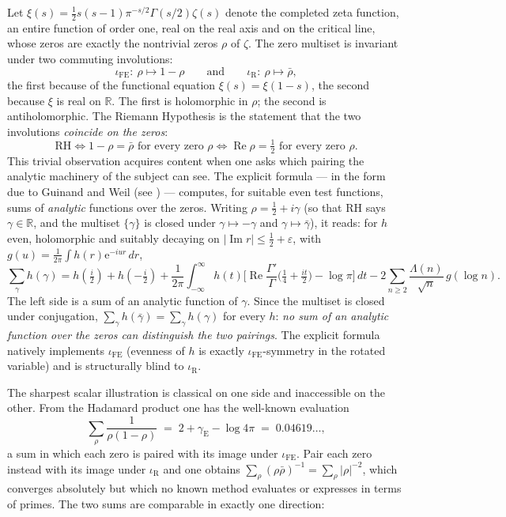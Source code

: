 \documentclass[11pt]{amsart}
\theoremstyle{definition}
\theoremstyle{remark}
\newcommand{\RR}{\mathbb{R}}
\newcommand{\eE}{\mathrm{e}}
\DeclareMathOperator{\Rre}{Re}
\DeclareMathOperator{\Iim}{Im}
\begin{document}
Let $\xi(s)=\tfrac12 s(s-1)\pi^{-s/2}\Gamma(s/2)\zeta(s)$ denote the completed zeta function, an entire function of order one, real on the real axis and on the critical line, whose zeros are exactly the nontrivial zeros $\rho$ of $\zeta$. The zero multiset is invariant under two commuting involutions:
\begin{equation}\label{eq:involutions}
\iota_{\mathrm{FE}}:\ \rho\mapsto 1-\rho \qquad\text{and}\qquad \iota_{\mathrm{R}}:\ \rho\mapsto\bar\rho,
\end{equation}
the first because of the functional equation $\xi(s)=\xi(1-s)$, the second because $\xi$ is real on $\RR$. The first is holomorphic in $\rho$; the second is antiholomorphic. The Riemann Hypothesis is the statement that the two involutions \emph{coincide on the zeros}:
\[
\mathrm{RH}\iff 1-\rho=\bar\rho \text{ for every zero } \rho \iff \Rre\rho=\tfrac12 \text{ for every zero }\rho.
\]
This trivial observation acquires content when one asks which pairing the analytic machinery of the subject can see. The explicit formula --- in the form due to Guinand and Weil (see \cite{IwaniecKowalski}) --- computes, for suitable even test functions, sums of \emph{analytic} functions over the zeros. Writing $\rho=\tfrac12+i\gamma$ (so that RH says $\gamma\in\RR$, and the multiset $\{\gamma\}$ is closed under $\gamma\mapsto-\gamma$ and $\gamma\mapsto\bar\gamma$), it reads: for $h$ even, holomorphic and suitably decaying on $|\Iim r|\le\tfrac12+\varepsilon$, with $g(u)=\tfrac1{2\pi}\int h(r)\eE^{-iur}\,dr$,
\begin{equation}\label{eq:GW}
\sum_\gamma h(\gamma)
= h(\tfrac i2)+h(-\tfrac i2)
+\frac1{2\pi}\int_{-\infty}^\infty h(t)\Big[\Rre\frac{\Gamma'}{\Gamma}\Big(\tfrac14+\tfrac{it}2\Big)-\log\pi\Big]\,dt
-2\sum_{n\ge2}\frac{\Lambda(n)}{\sqrt n}\,g(\log n).
\end{equation}
The left side is a sum of an analytic function of $\gamma$. Since the multiset is closed under conjugation, $\sum_\gamma h(\bar\gamma)=\sum_\gamma h(\gamma)$ for every $h$: \emph{no sum of an analytic function over the zeros can distinguish the two pairings}. The explicit formula natively implements $\iota_{\mathrm{FE}}$ (evenness of $h$ is exactly $\iota_{\mathrm{FE}}$-symmetry in the rotated variable) and is structurally blind to $\iota_{\mathrm{R}}$.

The sharpest scalar illustration is classical on one side and inaccessible on the other. From the Hadamard product one has the well-known evaluation
\begin{equation}\label{eq:classical}
\sum_\rho\frac1{\rho(1-\rho)} \;=\; 2+\gamma_{\mathrm{E}}-\log 4\pi \;=\; 0.04619\ldots,
\end{equation}
a sum in which each zero is paired with its image under $\iota_{\mathrm{FE}}$. Pair each zero instead with its image under $\iota_{\mathrm{R}}$ and one obtains $\sum_\rho (\rho\bar\rho)^{-1}=\sum_\rho|\rho|^{-2}$, which converges absolutely but which no known method evaluates or expresses in terms of primes. The two sums are comparable in exactly one direction:
\end{document}
